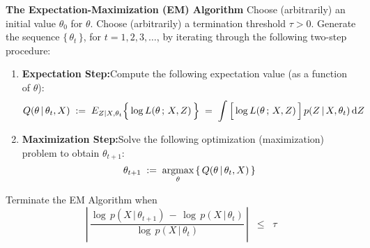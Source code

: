 \vskip 1.0cm
\noindent
\textbf{The Expectation-Maximization (EM) Algorithm}
\vskip 0.3cm
\noindent
Choose (arbitrarily) an initial value $\theta_{0}$ for $\theta$.
Choose (arbitrarily) a termination threshold $\tau > 0$.
Generate the sequence $\{\,\theta_{t}\,\}$, for $t = 1, 2, 3, \ldots$, by iterating through the following
two-step procedure:
\begin{enumerate}
\item
	\textbf{Expectation Step:}\quad Compute the following expectation value (as a function of $\theta$):
		\begin{equation}
		\label{EM:ExpectationStep}
		Q(\theta\,|\,\theta_{t},X)
		\; := \;
		E_{Z|X,\theta_{t}}\!\left\{\,\overset{{\color{white}.}}{\log}\,L(\theta\,;\,X,Z)\,\right\}
		\; = \;
		\int \left[\,\overset{{\color{white}.}}{\log}\,L(\theta\,;\,X,Z)\,\right] p(Z\,|\,X,\theta_{t})\,\textnormal{d}Z
		\end{equation}
\item
	\textbf{Maximization Step:}\quad Solve the following optimization (maximization) problem to obtain
		$\theta_{t+1}$:
		\begin{equation}
		\label{EM:MaximizationStep}
		\theta_{t+1} \; := \;
		\underset{\theta}{\textnormal{argmax}}\left\{\,Q(\theta\,|\,\theta_{t},X)\,\right\}
		\end{equation}
\end{enumerate}
Terminate the EM Algorithm when
\begin{equation}
\label{EM:terminationCriterion}
\left\vert\,\dfrac{\log\,p(X\,|\,\theta_{t+1})\,-\,\log\,p(X\,|\,\theta_{t})}{\log\,p(X\,|\,\theta_{t})}\,\right\vert
\;\; \leq \;\; \tau
\end{equation}
\vskip 1.0cm

